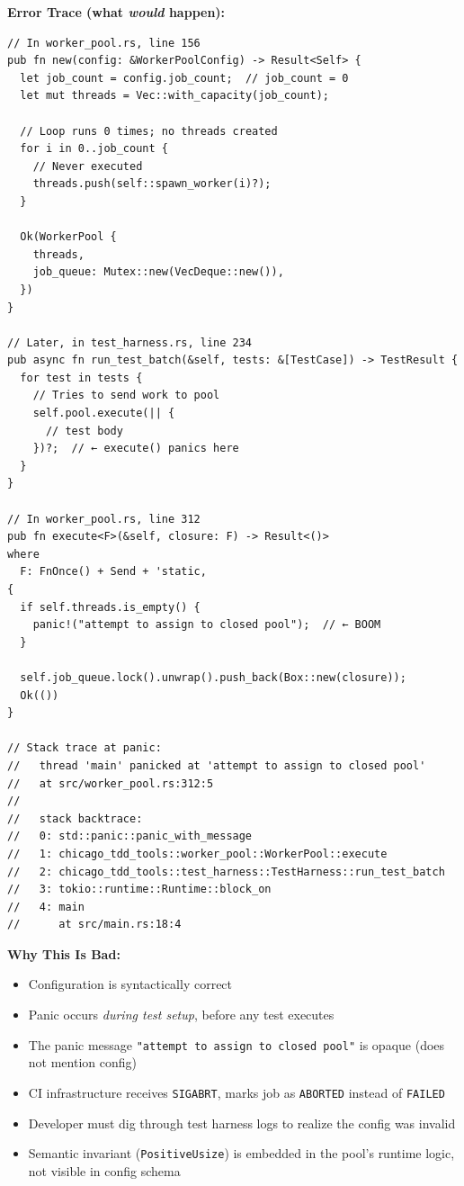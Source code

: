 \documentclass[11pt,a4paper]{article}
\begin{document}
\textbf{Error Trace (what \emph{would} happen):}

\begin{lstlisting}
// In worker_pool.rs, line 156
pub fn new(config: &WorkerPoolConfig) -> Result<Self> {
  let job_count = config.job_count;  // job_count = 0
  let mut threads = Vec::with_capacity(job_count);

  // Loop runs 0 times; no threads created
  for i in 0..job_count {
    // Never executed
    threads.push(self::spawn_worker(i)?);
  }

  Ok(WorkerPool {
    threads,
    job_queue: Mutex::new(VecDeque::new()),
  })
}

// Later, in test_harness.rs, line 234
pub async fn run_test_batch(&self, tests: &[TestCase]) -> TestResult {
  for test in tests {
    // Tries to send work to pool
    self.pool.execute(|| {
      // test body
    })?;  // ← execute() panics here
  }
}

// In worker_pool.rs, line 312
pub fn execute<F>(&self, closure: F) -> Result<()>
where
  F: FnOnce() + Send + 'static,
{
  if self.threads.is_empty() {
    panic!("attempt to assign to closed pool");  // ← BOOM
  }

  self.job_queue.lock().unwrap().push_back(Box::new(closure));
  Ok(())
}

// Stack trace at panic:
//   thread 'main' panicked at 'attempt to assign to closed pool'
//   at src/worker_pool.rs:312:5
//
//   stack backtrace:
//   0: std::panic::panic_with_message
//   1: chicago_tdd_tools::worker_pool::WorkerPool::execute
//   2: chicago_tdd_tools::test_harness::TestHarness::run_test_batch
//   3: tokio::runtime::Runtime::block_on
//   4: main
//      at src/main.rs:18:4
\end{lstlisting}

\textbf{Why This Is Bad:}
\begin{itemize}
  \item Configuration is syntactically correct
  \item Panic occurs \emph{during test setup}, before any test executes
  \item The panic message \texttt{"attempt to assign to closed pool"} is opaque (does not mention config)
  \item CI infrastructure receives \texttt{SIGABRT}, marks job as \texttt{ABORTED} instead of \texttt{FAILED}
  \item Developer must dig through test harness logs to realize the config was invalid
  \item Semantic invariant (\texttt{PositiveUsize}) is embedded in the pool's runtime logic, not visible in config schema
\end{itemize}
\end{document}
